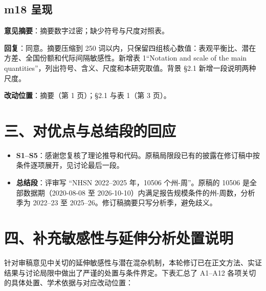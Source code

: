 \documentclass[UTF8,a4paper,11pt,fontset=none]{ctexart}
\providecommand{\tightlist}{\setlength{\itemsep}{1pt}\setlength{\parskip}{0pt}}
\begin{document}
\subsection*{m18 呈现}

\textbf{意见摘要}：摘要数字过密；缺少符号与尺度对照表。

\textbf{回复}：同意。摘要压缩到 250 词以内，只保留四组核心数值：表观平衡比、潜在方差、全国份额和代际间隔敏感性。新增表 1``Notation and scale of the main quantities''，列出符号、含义、尺度和本研究取值。背景 §2.1 新增一段说明两种尺度。

\textbf{改动位置}：摘要（第 1 页）；§2.1 与表 1（第 3 页）。

\section*{三、对优点与总结段的回应}

\begin{itemize}
\tightlist
\item
  \textbf{S1--S5}：感谢您复核了理论推导和代码。原稿局限段已有的披露在修订稿中按条件逐项展开，见讨论最后一段。
\item
  \textbf{总结段}：评审写 ``NHSN 2022--2025 年，10506 个州-周''。原稿的 10506 是全部数据期（2020-08-08 至 2026-10-10）内满足报告规模条件的州-周数，分析季为 2022--23 至 2025--26。修订稿摘要只写分析季，避免歧义。
\end{itemize}

\section*{四、补充敏感性与延伸分析处置说明}

针对审稿意见中关切的延伸敏感性与潜在混杂机制，本轮修订已在正文方法、实证结果与讨论局限中做出了严谨的处置与条件界定。下表汇总了 A1--A12 各项关切的具体处置、学术依据与对应改动位置：
\end{document}
